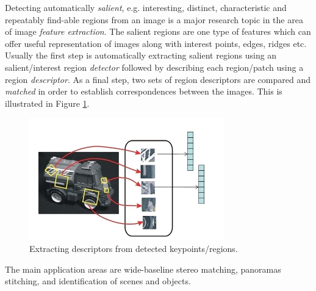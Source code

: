 Detecting automatically {\em salient}, e.g.  interesting, distinct, characteristic and repeatably find-able regions from an image is a major research topic in the area of image {\em feature extraction}. The salient regions are one type of features which can offer useful representation of images along with interest points, edges, ridges etc. Usually the first step is automatically extracting salient regions using an salient/interest region {\em detector} followed by describing each region/patch using a region {\em descriptor}. As a final step, two sets of region descriptors are compared and {\em matched} in order to establish correspondences between the images. This is illustrated in Figure \ref{fig:keydescr}.

\begin{figure}[H]
\begin{center}
\includegraphics[width=0.75\textwidth]{fig/KeypointsDescriptors}
\end{center}
\caption{Extracting descriptors from detected keypoints/regions.}
\label{fig:keydescr}
\end{figure}

The main application areas are wide-baseline stereo matching, panoramas stitching,  and identification of scenes and objects. 

